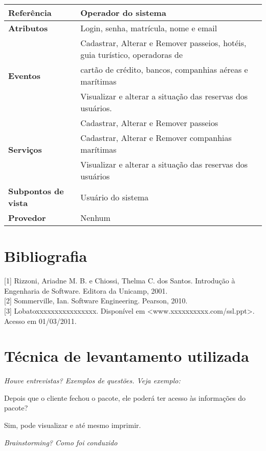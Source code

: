 \documentclass[12pt,a4paper]{article}
\begin{document}
\begin{table}[H]
\label{tab:VORD02}
\begin{small}
\begin{center}
    \begin{tabular}{ | l | l |}
    \hline
\textbf{Referência} & {Operador do sistema}\\ \hline
\textbf{Atributos} & Login, senha, matrícula, nome e email \\\hline
\multirow{3}{*}{\textbf{Eventos}} & Cadastrar, Alterar e Remover passeios, hotéis, guia turístico, operadoras de \\& cartão de crédito, bancos, companhias aéreas e marítimas\\ & Visualizar e alterar a situação das reservas dos usuários. \\\hline
\multirow{3}{*}{\textbf{Serviços}} & Cadastrar, Alterar e Remover passeios\\ & Cadastrar, Alterar e Remover companhias marítimas \\& Visualizar e alterar a situação das reservas dos usuários\\\hline
\textbf{Subpontos de vista} & Usuário do sistema\\\hline
\textbf{Provedor} & Nenhum\\\hline
    \end{tabular}
\end{center}    
\end{small}
\end{table}

\section{Bibliografia}
[1]  Rizzoni, Ariadne M. B. e Chiossi, Thelma C. dos Santos. Introdução à Engenharia de Software. Editora da Unicamp, 2001.\\

[2]  Sommerville, Ian. Software Engineering. Pearson, 2010.\\

[3]  Lobatoxxxxxxxxxxxxxxxx. Disponível em <www.xxxxxxxxxx.com/ssl.ppt>. Acesso em 01/03/2011.

\newpage
\section{Técnica de levantamento utilizada}

\textit{Houve entrevistas? Exemplos de questões. Veja exemplo:}

Depois que o cliente fechou o pacote, ele poderá ter acesso às informações do pacote?

Sim, pode visualizar e até mesmo imprimir.


\textit{Brainstorming? Como foi conduzido}
\end{document}
